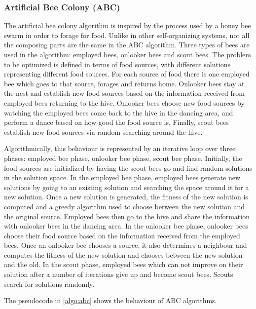 {\subsubsection{Artificial Bee Colony (ABC)}

The artificial bee colony algorithm \cite{A_comprehensive_survey_artificial_bee_colony_ABC_a.pdf} is inspired by the process used by a honey bee swarm in order to forage for food. Unlike in other self-organizing systems, not all the composing parts are the same in the ABC algorithm. Three types of bees are used in the algorithm: employed bees, onlooker bees and scout bees. The problem to be optimized is defined in terms of food sources, with different solutions representing different food sources. For each source of food there is one employed bee which goes to that source, forages and returns home. Onlooker bees stay at the nest and establish new food sources based on the information received from employed bees returning to the hive. Onlooker bees choose new food sources by watching the employed bees come back to the hive in the dancing area, and perform a dance based on how good the food source is. Finally, scout bees establish new food sources via random searching around the hive.

Algorithmically, this behaviour is represented by an iterative loop over three phases: employed bee phase, onlooker bee phase, scout bee phase. Initially, the food sources are initialized by having the scout bees go and find random solutions in the solution space. In the employed bee phase, employed bees generate new solutions by going to an existing solution and searching the space around it for a new solution. Once a new solution is generated, the fitness of the new solution is computed and a greedy algorithm used to choose between the new solution and the original source. Employed bees then go to the hive and share the information with onlooker bees in the dancing area. In the onlooker bee phase, onlooker bees choose their food source based on the information received from the employed bees. Once an onlooker bee chooses a source, it also determines a neighbour and computes the fitness of the new solution and chooses between the new solution and the old. In the scout phase, employed bees which can not improve on their solution after a number of iterations give up and become scout bees. Scouts search for solutions randomly.

The pseudocode in \ref{algo:abc} shows the behaviour of ABC algorithms.

\begin{algorithm}
Initialize solutions randomly using scout bees
return $best{solution)$
\caption{Artificial Bee Colony}\label{algo:abc}
\end{algorithm}

}
